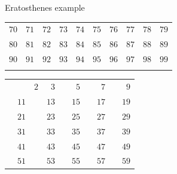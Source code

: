 \documentclass{beamer}
\begin{document}
\begin{frame}[plain]{Eratosthenes example}
{\begin{tabular}{r r r r r r r r r r}
			\color{  red} $70$ & \color{black} $71$ & \color{  red} $72$ & \color{black} $73$ & \color{  red} $74$ & \color{black} $75$ & \color{  red} $76$ & \color{black} $77$ & \color{  red} $78$ & \color{black} $79$\\
			\color{  red} $80$ & \color{black} $81$ & \color{  red} $82$ & \color{black} $83$ & \color{  red} $84$ & \color{black} $85$ & \color{  red} $86$ & \color{black} $87$ & \color{  red} $88$ & \color{black} $89$\\
			\color{  red} $90$ & \color{black} $91$ & \color{  red} $92$ & \color{black} $93$ & \color{  red} $94$ & \color{black} $95$ & \color{  red} $96$ & \color{black} $97$ & \color{  red} $98$ & \color{black} $99$\\
			\phantom{$888$} & \phantom{$888$} & \phantom{$888$} & \phantom{$888$} & \phantom{$888$} & \phantom{$888$} & \phantom{$888$} & \phantom{$888$} & \phantom{$888$} & \phantom{$888$}
        \end{tabular}
	}
	 {
		\begin{tabular}{r r r r r r r r r r}
			                   &                    & \color{ blue}  $2$ & \color{black}  $3$ &                    & \color{black}  $5$ &                    & \color{black}  $7$ &                    & \color{black}  $9$\\
			                   & \color{black} $11$ &                    & \color{black} $13$ &                    & \color{black} $15$ &                    & \color{black} $17$ &                    & \color{black} $19$\\
			                   & \color{black} $21$ &                    & \color{black} $23$ &                    & \color{black} $25$ &                    & \color{black} $27$ &                    & \color{black} $29$\\
			                   & \color{black} $31$ &                    & \color{black} $33$ &                    & \color{black} $35$ &                    & \color{black} $37$ &                    & \color{black} $39$\\
			                   & \color{black} $41$ &                    & \color{black} $43$ &                    & \color{black} $45$ &                    & \color{black} $47$ &                    & \color{black} $49$\\
			                   & \color{black} $51$ &                    & \color{black} $53$ &                    & \color{black} $55$ &                    & \color{black} $57$ &                    & \color{black} $59$\\

\end{tabular}}
\end{frame}
\end{document}
